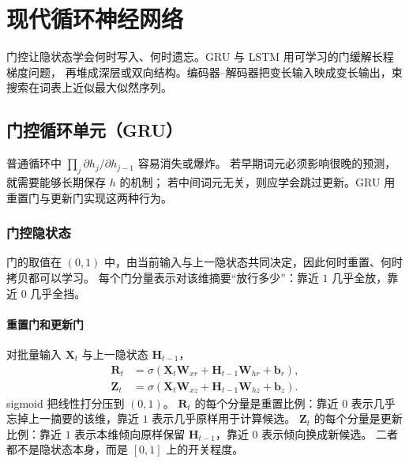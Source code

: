 \chapter{现代循环神经网络}

门控让隐状态学会何时写入、何时遗忘。GRU 与 LSTM 用可学习的门缓解长程梯度问题，
再堆成深层或双向结构。编码器--解码器把变长输入映成变长输出，束搜索在词表上近似最大似然序列。

\section{门控循环单元（GRU）}





普通循环中 $\prod_j\partial h_j/\partial h_{j-1}$ 容易消失或爆炸。
若早期词元必须影响很晚的预测，就需要能够长期保存 $h$ 的机制；
若中间词元无关，则应学会跳过更新。GRU 用重置门与更新门实现这两种行为。

\subsection{门控隐状态}

门的取值在 $(0,1)$ 中，由当前输入与上一隐状态共同决定，因此何时重置、何时拷贝都可以学习。
每个门分量表示对该维摘要“放行多少”：靠近 $1$ 几乎全放，靠近 $0$ 几乎全挡。

\subsubsection{重置门和更新门}

对批量输入 $\bm{X}_t$ 与上一隐状态 $\bm{H}_{t-1}$，
\begin{align*}
\bm{R}_t
&=
\sigma(\bm{X}_t\bm{W}_{xr}+\bm{H}_{t-1}\bm{W}_{hr}+\bm{b}_r),
\\
\bm{Z}_t
&=
\sigma(\bm{X}_t\bm{W}_{xz}+\bm{H}_{t-1}\bm{W}_{hz}+\bm{b}_z).
\end{align*}
sigmoid 把线性打分压到 $(0,1)$。
$\bm{R}_t$ 的每个分量是重置比例：靠近 $0$ 表示几乎忘掉上一摘要的该维，靠近 $1$ 表示几乎原样用于计算候选。
$\bm{Z}_t$ 的每个分量是更新比例：靠近 $1$ 表示本维倾向原样保留 $\bm{H}_{t-1}$，靠近 $0$ 表示倾向换成新候选。
二者都不是隐状态本身，而是 $[0,1]$ 上的开关程度。

